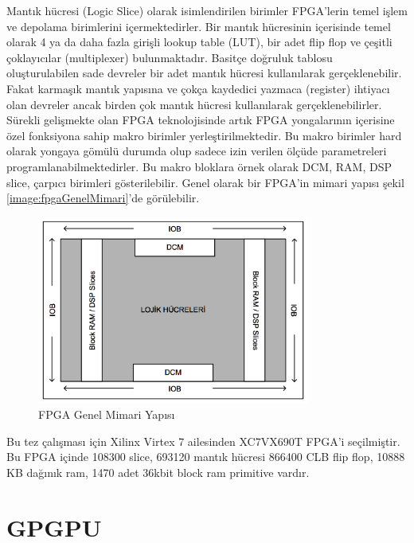 Mantık hücresi (Logic Slice) olarak isimlendirilen birimler FPGA’lerin temel işlem ve depolama birimlerini içermektedirler. Bir mantık hücresinin içerisinde temel olarak 4 ya da daha fazla girişli lookup table (LUT), bir adet flip flop ve çeşitli çoklayıcılar (multiplexer) bulunmaktadır. Basitçe doğruluk tablosu oluşturulabilen sade devreler bir adet mantık hücresi kullanılarak gerçeklenebilir. Fakat karmaşık mantık yapısına ve çokça kaydedici yazmaca (register) ihtiyacı olan devreler ancak birden çok mantık hücresi kullanılarak gerçeklenebilirler. Sürekli gelişmekte olan FPGA teknolojisinde artık FPGA yongalarının içerisine özel fonksiyona sahip makro birimler yerleştirilmektedir. Bu makro birimler hard olarak yongaya gömülü durumda olup sadece izin verilen ölçüde parametreleri programlanabilmektedirler. Bu makro bloklara örnek olarak DCM, RAM, DSP slice, çarpıcı birimleri gösterilebilir. Genel olarak bir FPGA’in mimari yapısı şekil \ref{image:fpgaGenelMimari}’de görülebilir.
\begin{figure}[h]
\centering
\shorthandoff{=}
\includegraphics[width=0.8\textwidth]{gorsel/fpgaGenelMimari.png}
\shorthandoff{=}
\caption{FPGA Genel Mimari Yapısı}
\label{fpgaGenelMimari}
\end{figure}
Bu tez çalışması için Xilinx Virtex 7 ailesinden XC7VX690T FPGA’i seçilmiştir. Bu FPGA içinde 108300 slice, 693120 mantık hücresi 866400 CLB flip flop, 10888 KB dağınık ram, 1470 adet 36kbit block ram primitive vardır. \par

\section{GPGPU}

